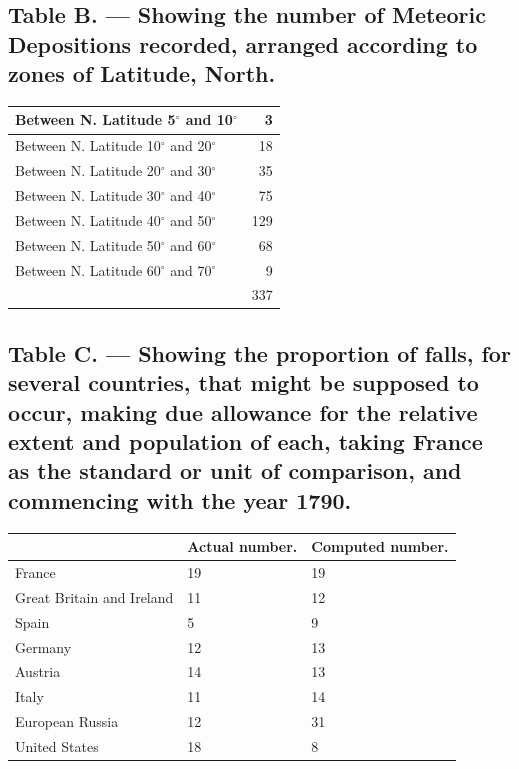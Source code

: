 \documentclass[a4paper, 12pt, oneside]{article}
\begin{document}
\subsection{Table B. --- Showing the number of Meteoric Depositions recorded, arranged according to zones of Latitude, North.}
\begin{table}[H]
    \centering
    \bfseries
    \Fontauri
    \begin{tabular}{|l|r|}
    \hline
        Between N. Latitude 5$^\circ$ and 10$^\circ$ & 3 \\ \hline
        Between N. Latitude 10$^\circ$ and 20$^\circ$ & 18 \\ \hline
        Between N. Latitude 20$^\circ$ and 30$^\circ$ & 35 \\ \hline
        Between N. Latitude 30$^\circ$ and 40$^\circ$ & 75 \\ \hline
        Between N. Latitude 40$^\circ$ and 50$^\circ$ & 129 \\ \hline
        Between N. Latitude 50$^\circ$ and 60$^\circ$ & 68 \\ \hline
        Between N. Latitude 60$^\circ$ and 70$^\circ$ & 9 \\ \hline \hline
        ~ & 337 \\ \hline
    \end{tabular}
\end{table}
\subsection{Table C. --- Showing the proportion of falls, for several countries, that might be supposed to occur, making due allowance for the relative extent and population of each, taking France as the standard or unit of comparison, and commencing with the year 1790.}
\begin{table}[!ht]
    \centering
    \bfseries
    \Fontauri
    \begin{tabular}{|l|l|l|}
    \hline
         ~ & Actual number. & Computed number. \\ \hline
        France & 19 & 19 \\ \hline
        Great Britain and Ireland & 11 & 12 \\ \hline
        Spain & 5 & 9 \\ \hline
        Germany & 12 & 13 \\ \hline
        Austria & 14 & 13 \\ \hline
        Italy & 11 & 14 \\ \hline
        European Russia & 12 & 31 \\ \hline
        United States & 18 & 8 \\ \hline
    \end{tabular}
\end{table}                
\end{document}
